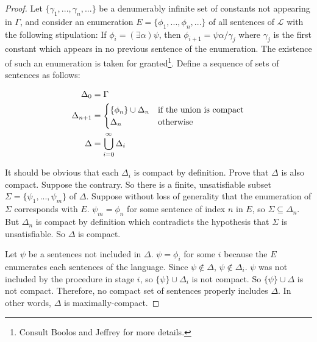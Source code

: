\documentclass[12pt]{article}
\theoremstyle{definition}
\theoremstyle{remark}
\begin{document}
\begin{proof}
	Let $\{ \gamma_1, ..., \gamma_n, ...\}$ be a denumerably infinite set of constants not appearing in $\Gamma$, and consider an enumeration $E = \{ \phi_1, ..., \phi_n, ... \}$ of all sentences of $\mathscr{L}$ with the following stipulation: If $\phi_i = (\exists \alpha)\psi$, then $\phi_{i+1}=\psi\alpha/\gamma_j$ where $\gamma_j$ is the first constant which appears in no previous sentence of the enumeration. The existence of such an enumeration is taken for granted\footnote{Consult Boolos and Jeffrey\cite{boolosjeffrey} for more details.}. Define a sequence of sets of sentences as follows:
	
	\begin{align*}
	\Delta_0 &= \Gamma \\
	\Delta_{n+1} &= \begin{cases}
	\{ \phi_n \} \cup \Delta_n & \textnormal{if the union is compact} \\
	\Delta_n & \textnormal{otherwise}
	\end{cases}\\
	\Delta &= \bigcup_{i=0}^\infty \Delta_i
	\end{align*}
	
	It should be obvious that each $\Delta_i$ is compact by definition. Prove that $\Delta$ is also compact. Suppose the contrary. So there is a finite, unsatisfiable subset $\Sigma = \{ \psi_1, ..., \psi_m \}$ of $\Delta$. Suppose without loss of generality that the enumeration of $\Sigma$ corresponds with $E$. $\psi_m = \phi_n$ for some sentence of index $n$ in $E$, so $\Sigma \subseteq \Delta_n$. But $\Delta_n$ is compact by definition which contradicts the hypothesis that $\Sigma$ is unsatisfiable. So $\Delta$ is compact.
	
	Let $\psi$ be a sentences not included in $\Delta$. $\psi=\phi_i$ for some $i$ because the $E$ enumerates each sentences of the language. Since $\psi \not\in \Delta$, $\psi \not\in \Delta_i$. $\psi$ was not included by the procedure in stage $i$, so $\{ \psi \} \cup \Delta_i$ is not compact. So $\{ \psi \} \cup \Delta$ is not compact. Therefore, no compact set of sentences properly includes $\Delta$. In other words, $\Delta$ is maximally-compact.
	

\end{proof}
\end{document}

